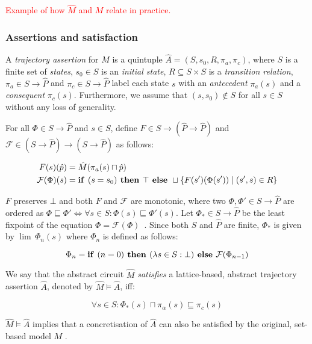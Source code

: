 \textcolor{red}{Example of how $\hat M$ and $M$ relate in practice.}

\subsubsection{Assertions and satisfaction} A \textit{trajectory assertion} for $\hat M$ is a quintuple $\hat A = (S,s_{0},R,\pi_{a},\pi_{c})$, where $S$ is a finite set of \textit{states}, $s_{0} \in S$ is an \textit{initial state}, $R \subseteq S \times S$ is a \textit{transition relation}, $\pi_{a} \in S \rightarrow \hat P$ and $\pi_{c} \in S \rightarrow \hat P$ label each state $s$ with an \textit{antecedent} $\pi_{a}(s)$ and a \textit{consequent} $\pi_{c}(s)$. Furthermore, we assume that $(s,s_{0}) \notin S$ for all $s \in S$ without any loss of generality.

For all $\Phi \in S \rightarrow \hat P$ and $s \in S$, define $F \in S \rightarrow (\hat P \rightarrow \hat P)$ and $\mathcal{F} \in (S \rightarrow \hat P) \rightarrow (S \rightarrow \hat P)$ as follows:

\begin{align}
F(s)(\hat p) &= \hat M(\pi_{a}(s) \sqcap \hat p) \\
\mathcal{F}(\Phi)(s) &= \textrm{\textbf{if }} (s = s_{0}) \textrm{\textbf{ then }} \top \textrm{\textbf{ else }} \sqcup \{ F(s')(\Phi(s')) \mid (s',s) \in R \}
\end{align}

\noindent $F$ preserves $\bot$ and both $F$ and $\mathcal{F}$ are monotonic, where two $\Phi, \Phi' \in S \rightarrow \hat P$ are ordered as $\Phi \sqsubseteq \Phi' \iff \forall s \in S : \Phi(s) \sqsubseteq \Phi'(s)$. Let $\Phi_{*} \in S \rightarrow \hat P$ be the least fixpoint of the equation $\Phi = \mathcal{F}(\Phi)$~\cite{davey2002}. Since both $S$ and $\hat P$ are finite, $\Phi_{*}$ is given by $\lim \, \Phi_{n}(s)$ where $\Phi_{n}$ is defined as follows:

\begin{equation}
\Phi_{n} = \textrm{\textbf{if }} (n = 0) \textrm{\textbf{ then }} (\lambda s \in S : \bot) \textrm{\textbf{ else }} \mathcal{F}(\Phi_{n-1})
\end{equation}

We say that the abstract circuit $\hat M$ \textit{satisfies} a lattice-based, abstract trajectory assertion $\hat A$, denoted by $\hat M \models \hat A$, iff:

\begin{equation}
\forall s \in S : \Phi_{*}(s) \sqcap \pi_{\alpha}(s) \sqsubseteq \pi_{c}(s)
\end{equation}

\noindent $\hat M \models \hat A$ implies that a concretisation of $\hat A$ can also be satisfied by the original, set-based model $M$ \cite{chou1999}.
